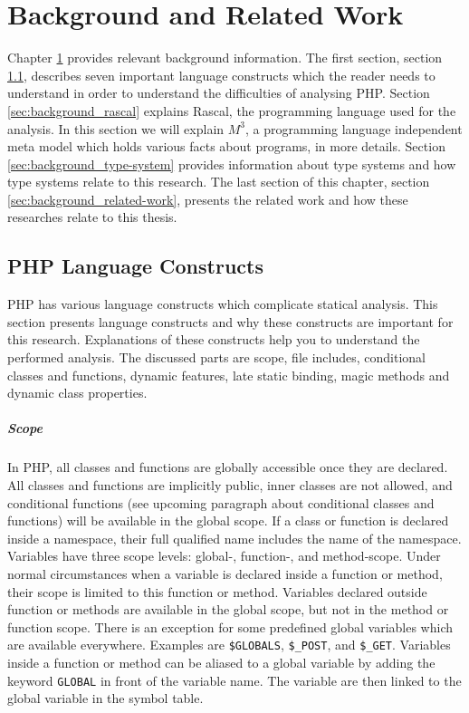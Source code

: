 \documentclass[../main.tex]{subfiles}
\begin{document}
    \chapter{Background and Related Work}\label{ch:background}
    Chapter \ref{ch:background} provides relevant background information.
    The first section, section \ref{sec:background_language-constructs}, describes seven important language constructs which the reader needs to understand in order to understand the difficulties of analysing PHP.
    Section \ref{sec:background_rascal} explains \Gls{Rascal}, the programming language used for the analysis.
    In this section we will explain $M^3$, a programming language independent meta model which holds various facts about programs, in more details.
    Section \ref{sec:background_type-system} provides information about type systems and how type systems relate to this research.
    The last section of this chapter, section \ref{sec:background_related-work}, presents the related work and how these researches relate to this thesis.

    \section{PHP Language Constructs}\label{sec:background_language-constructs}
    PHP has various language constructs which complicate statical analysis. 
    This section presents language constructs and why these constructs are important for this research.
    Explanations of these constructs help you to understand the performed analysis.
    The discussed parts are scope, file includes, conditional classes and functions, dynamic features, late static binding, magic methods and dynamic class properties.
    
    \paragraph{Scope}
    In PHP, all classes and functions are globally accessible once they are declared.
    All classes and functions are implicitly public, inner classes are not allowed, and conditional functions (see upcoming paragraph about conditional classes and functions) will be available in the global scope.
    If a class or function is declared inside a namespace, their full qualified name includes the name of the namespace.
    \\
    Variables have three scope levels: global-, function-, and method-scope.
    Under normal circumstances when a variable is declared inside a function or method, their scope is limited to this function or method.
    Variables declared outside function or methods are available in the global scope, but not in the method or function scope.
    There is an exception for some predefined global variables which are available everywhere. 
    Examples are \texttt{\$GLOBALS}, \texttt{\$\_POST}, and \texttt{\$\_GET}. 
    Variables inside a function or method can be aliased to a global variable by adding the keyword \texttt{GLOBAL} in front of the variable name.
    The variable are then linked to the global variable in the symbol table\footnotemark.
    
\end{document}
